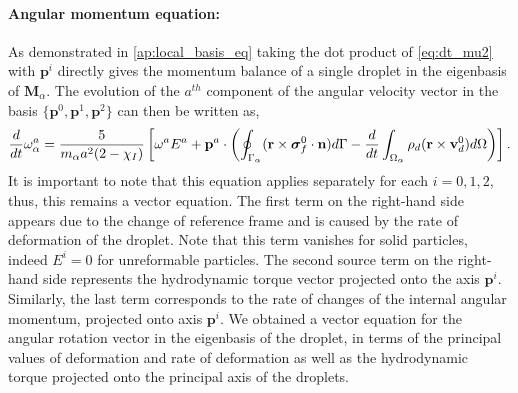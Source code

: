 \paragraph*{Angular momentum equation:}
As demonstrated in \ref{ap:local_basis_eq} taking the dot product of \ref{eq:dt_mu2} with $\textbf{p}^i$ directly gives the momentum balance of a single droplet in the eigenbasis of $\textbf{M}_\alpha$. 
The evolution of the $a^{th}$ component of the angular velocity vector in the basis $\{\textbf{p}^0, \textbf{p}^1, \textbf{p}^2\}$ can then be written as, 
\begin{equation}
    \ddt\omega^a_\alpha
    = 
    \frac{5}{m_\alpha a^2 (2 - \chi_I)}
    \left[
    \omega^a E^a 
    +
    \textbf{p}^a \cdot \left(
        \intS{(\textbf{r}\times\bm\sigma_f^0\cdot \textbf{n})} 
        - \ddt\intO{\rho_d(\textbf{r}\times \textbf{v}_d^0)}
    \right)
    \right].  
    \label{eq:dt_omega_a}  
\end{equation}
It is important to note that this equation applies separately for each $i = 0,1,2$, thus, this remains a vector equation. 
The first term on the right-hand side appears due to the change of reference frame and is caused by the rate of deformation of the droplet.
Note that this term vanishes for solid particles, indeed $E^i = 0$ for unreformable particles. 
The second source term on the right-hand side represents the hydrodynamic torque vector projected onto the axis $\textbf{p}^i$. 
Similarly, the last term corresponds to the rate of changes of the internal angular momentum, projected onto axis $\textbf{p}^i$. 
We obtained a vector equation for the angular rotation vector in the eigenbasis of the droplet, in terms of the principal values of deformation and rate of deformation as well as the hydrodynamic torque projected onto the principal axis of the droplets.  




